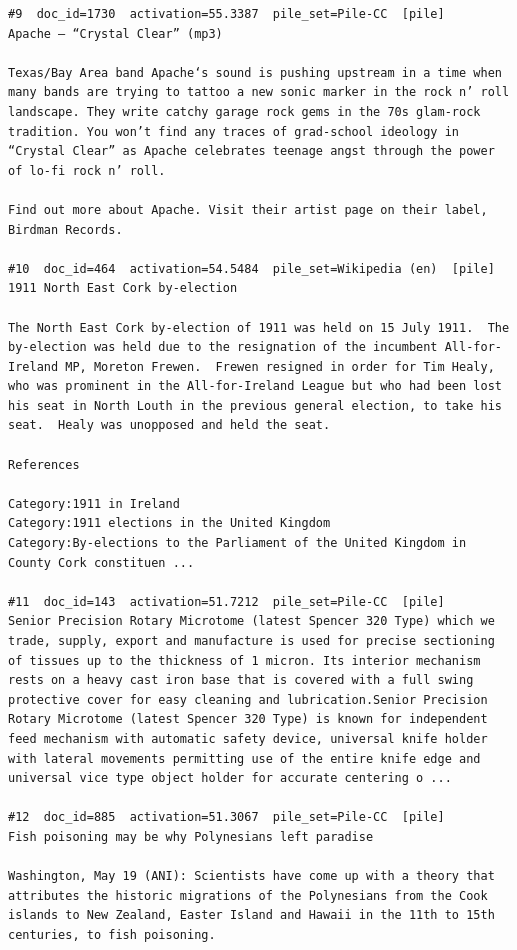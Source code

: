 \begin{verbatim}
#9  doc_id=1730  activation=55.3387  pile_set=Pile-CC  [pile]
Apache – “Crystal Clear” (mp3)

Texas/Bay Area band Apache‘s sound is pushing upstream in a time when many bands are trying to tattoo a new sonic marker in the rock n’ roll landscape. They write catchy garage rock gems in the 70s glam-rock tradition. You won’t find any traces of grad-school ideology in “Crystal Clear” as Apache celebrates teenage angst through the power of lo-fi rock n’ roll.

Find out more about Apache. Visit their artist page on their label, Birdman Records.

#10  doc_id=464  activation=54.5484  pile_set=Wikipedia (en)  [pile]
1911 North East Cork by-election

The North East Cork by-election of 1911 was held on 15 July 1911.  The by-election was held due to the resignation of the incumbent All-for-Ireland MP, Moreton Frewen.  Frewen resigned in order for Tim Healy, who was prominent in the All-for-Ireland League but who had been lost his seat in North Louth in the previous general election, to take his seat.  Healy was unopposed and held the seat.

References

Category:1911 in Ireland
Category:1911 elections in the United Kingdom
Category:By-elections to the Parliament of the United Kingdom in County Cork constituen ...

#11  doc_id=143  activation=51.7212  pile_set=Pile-CC  [pile]
Senior Precision Rotary Microtome (latest Spencer 320 Type) which we trade, supply, export and manufacture is used for precise sectioning of tissues up to the thickness of 1 micron. Its interior mechanism rests on a heavy cast iron base that is covered with a full swing protective cover for easy cleaning and lubrication.Senior Precision Rotary Microtome (latest Spencer 320 Type) is known for independent feed mechanism with automatic safety device, universal knife holder with lateral movements permitting use of the entire knife edge and universal vice type object holder for accurate centering o ...

#12  doc_id=885  activation=51.3067  pile_set=Pile-CC  [pile]
Fish poisoning may be why Polynesians left paradise

Washington, May 19 (ANI): Scientists have come up with a theory that attributes the historic migrations of the Polynesians from the Cook islands to New Zealand, Easter Island and Hawaii in the 11th to 15th centuries, to fish poisoning.


\end{verbatim}
